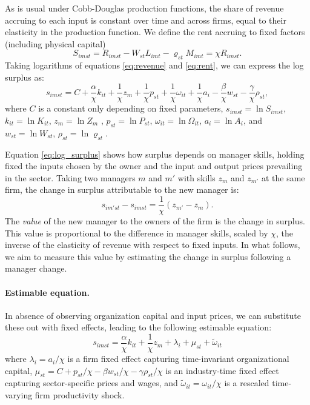 \documentclass[11pt,a4paper]{article}
\begin{document}
As is usual under Cobb-Douglas production functions, the share of revenue accruing to each input is constant over time and across firms, equal to their elasticity in the production function. We define the rent accruing to fixed factors (including physical capital) 
\begin{equation}\label{eq:rent}
S_{imst} = R_{imst} - W_{st}L_{imt} - \varrho_{st}M_{imt} = \chi R_{imst}.
\end{equation}
Taking logarithms of equations \eqref{eq:revenue} and \eqref{eq:rent}, we can express the log surplus as:      
\begin{equation}\label{eq:log_surplus}
s_{imst} = C+\frac\alpha\chi k_{it} + \frac1\chi {z}_{m} + \frac1\chi p_{st} + \frac1\chi{\omega}_{it}+\frac1\chi a_i 
- \frac\beta\chi w_{st} - \frac\gamma\chi \rho_{st},
\end{equation}
where $C$ is a constant only depending on fixed parameters, $s_{imst} = \ln S_{imst}$, $k_{it} = \ln K_{it}$, ${z}_{m} = \ln Z_m$ , $ p_{st} = \ln P_{st}$, ${\omega}_{it} = \ln\Omega_{it}$, $a_i = \ln A_i$, and $w_{st} = \ln W_{st}$, $\rho_{st} = \ln \varrho_{st}$. 

Equation \eqref{eq:log_surplus} shows how surplus depends on manager skills, holding fixed the inputs chosen by the owner and the input and output prices prevailing in the sector. Taking two managers $m$ and $m'$ with skills ${z}_m$ and ${z}_{m'}$ at the same firm, the change in surplus attributable to the new manager is:
\begin{equation}\label{eq:manager_change}
s_{im'st} - s_{imst} = \frac1\chi({z}_{m'} - {z}_{m}).
\end{equation}
The \emph{value} of the new manager to the owners of the firm is the change in surplus. This value is proportional to the difference in manager skills, scaled by $\chi$, the inverse of the elasticity of revenue with respect to fixed inputs. In what follows, we aim to measure this value by estimating the change in surplus following a manager change.

\paragraph{Estimable equation.} In absence of observing organization capital and input prices, we can substitute these out with fixed effects, leading to the following estimable equation:
\begin{equation}\label{eq:estimation}
s_{imst} = \frac\alpha\chi k_{it}  + \frac1\chi z_m + \lambda_i + \mu_{st} + \tilde \omega_{it}
\end{equation}
where $\lambda_i = a_i/\chi$ is a firm fixed effect capturing time-invariant organizational capital, $\mu_{st} = C + p_{st}/\chi - \beta w_{st}/\chi - \gamma\rho_{st}/\chi$ is an industry-time fixed effect capturing sector-specific prices and wages, and $\tilde\omega_{it} = \omega_{it}/\chi$ is a rescaled time-varying firm productivity shock. 
\end{document}
